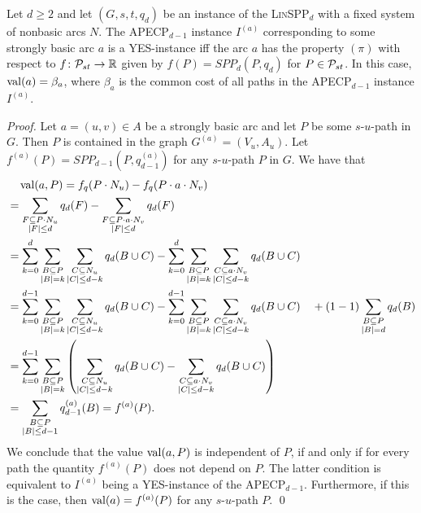\begin{lemma}
\label{lemma:corresponding-instance}
Let $d \geq 2$ and let  $(G, s,t, q_d)$ be an instance of the \textsc{Lin}SPP$_d$ with a fixed system of nonbasic arcs  $N$. 
The APECP$_{d-1}$ instance $I^{(a)}$ corresponding to some strongly basic arc $a$ is a \textsc{YES}-instance iff the arc $a$ has the property $(\pi)$ with respect to $f\colon \mathcal{P}_{st}\to\mathbb{R}$ given by $f(P)=SPP_d(P,q_d)$ for $P\in \mathcal{P}_{st}$. In this case, $\operatorname{val}(a) = \beta_a$, where $\beta_a$ is the common cost of all paths in the APECP$_{d-1}$ instance $I^{(a)}$.
\end{lemma}
\begin{proof}
Let $a = (u,v) \in A$ be a strongly basic arc and let $P$ be some $s$-$u$-path in $G$. Then $P$ is  contained in the graph $G^{(a)} = (V_u, A_u)$. 
Let $f^{(a)}(P)=SPP_{d-1}(P,q^{(a)}_{d-1})$ for any $s$-$u$-path $P$ in $G$. We have that
\begin{align*}
    &\quad \operatorname{val}(a, P) = f_q(P \cdot N_u) - f_q(P \cdot a \cdot N_v) \\
    &= \sum_{\substack{F \subseteq P \cdot N_u\\ |F| \leq d}}q_d(F) - \sum_{\substack{F \subseteq P \cdot a \cdot N_v\\ |F| \leq d}}q_d(F)\\
    &= \sum_{k=0}^d \sum_{\substack{B \subseteq P\\ |B| = k}}\sum_{\substack{C \subseteq N_u\\ |C| \leq d - k}}q_d(B \cup C) - \sum_{k=0}^d \sum_{\substack{B \subseteq P\\ |B| = k}}\sum_{\substack{C \subseteq a \cdot N_v\\ |C| \leq d - k}}q_d(B \cup C)\\
    &= \sum_{k=0}^{d-1} \sum_{\substack{B \subseteq P\\ |B| = k}}\sum_{\substack{C \subseteq N_u\\ |C| \leq d - k}}q_d(B \cup C) - \sum_{k=0}^{d-1} \sum_{\substack{B \subseteq P\\ |B| = k}}\sum_{\substack{C \subseteq a \cdot N_v\\ |C| \leq d - k}}q_d(B \cup C) \quad +  (1 - 1)\sum_{\substack{B \subseteq P\\ |B| = d}}q_d(B)\\
     &= \sum_{k=0}^{d-1} \sum_{\substack{B \subseteq P\\ |B| = k}}\left(\sum_{\substack{C \subseteq N_u\\ |C| \leq d - k}}q_d(B \cup C) - \sum_{\substack{C \subseteq a \cdot N_v\\ |C| \leq d - k}}q_d(B \cup C)
     \right)\\
     &= \sum_{\substack{B \subseteq P\\ |B| \leq d-1}}q^{(a)}_{d-1}(B) = f^{(a)}(P).
\end{align*}
We conclude that the value $\operatorname{val}(a, P)$ is independent of $P$, if and only if for every path the quantity $f^{(a)}(P)$ does not depend on $P$. The latter condition is equivalent to  $I^{(a)}$  being a \textsc{YES}-instance of the APECP$_{d-1}$. Furthermore, if this is the case, then $\operatorname{val}(a) = f^{(a)}(P)$ for any $s$-$u$-path $P$.
\qed
\end{proof}

